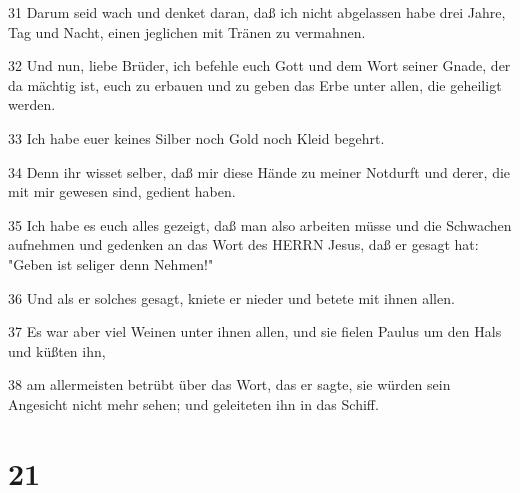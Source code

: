 \par 31 Darum seid wach und denket daran, daß ich nicht abgelassen habe drei Jahre, Tag und Nacht, einen jeglichen mit Tränen zu vermahnen.
\par 32 Und nun, liebe Brüder, ich befehle euch Gott und dem Wort seiner Gnade, der da mächtig ist, euch zu erbauen und zu geben das Erbe unter allen, die geheiligt werden.
\par 33 Ich habe euer keines Silber noch Gold noch Kleid begehrt.
\par 34 Denn ihr wisset selber, daß mir diese Hände zu meiner Notdurft und derer, die mit mir gewesen sind, gedient haben.
\par 35 Ich habe es euch alles gezeigt, daß man also arbeiten müsse und die Schwachen aufnehmen und gedenken an das Wort des HERRN Jesus, daß er gesagt hat: "Geben ist seliger denn Nehmen!"
\par 36 Und als er solches gesagt, kniete er nieder und betete mit ihnen allen.
\par 37 Es war aber viel Weinen unter ihnen allen, und sie fielen Paulus um den Hals und küßten ihn,
\par 38 am allermeisten betrübt über das Wort, das er sagte, sie würden sein Angesicht nicht mehr sehen; und geleiteten ihn in das Schiff.

\chapter{21}

